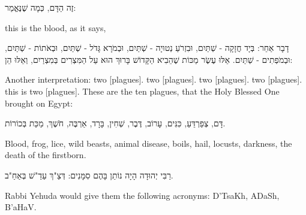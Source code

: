 
זֶה הַדָּם, כְּמָה שֶׁנֶּאֱמַר: 

\begin{english}
 this is the blood, as it says, 
\end{english}

\vspace{2em}


דָבָר אַחֵר: בְּיָד חֲזָקָה - שְׁתַּיִם, וּבִזְרֹעַ נְטוּיָה - שְׁתַּיִם, וּבְמֹרָא גָּדֹל - שְׁתַּיִם, וּבְאֹתוֹת - שְׁתַּיִם, וּבְמֹפְתִים - שְׁתַּיִם. אֵלּוּ עֶשֶׂר מַכּוֹת שֶׁהֵבִיא הַקָּדוֹשׁ בָּרוּךְ הוּא עַל הַמִּצְרִים בְּמִצְרַיִם, וְאֵלּוּ הֵן:



\begin{english}
Another interpretation:  two [plagues].  two [plagues].  two [plagues].  two [plagues].  this is two [plagues]. These are the ten plagues, that the Holy Blessed One brought on Egypt:
\end{english}

דָּם, צְפַרְדֵּעַ, כִּנִּים, עָרוֹב, דֶּבֶר, שְׁחִין, בָּרָד, אַרְבֶּה, חֹשֶׁךְ, מַכַּת בְּכוֹרוֹת.

\begin{english}
Blood, frog, lice, wild beasts, animal disease, boils, hail, locusts, darkness, the death of the firstborn.
\end{english}

רַבִּי יְהוּדָה הָיָה נוֹתֵן בָּהֶם סִמָּנִים: דְּצַ"ךְ עַדַ"שׁ בְּאַחַ"ב.

\begin{english}
Rabbi Yehuda would give them the following acronyms: D'TsaKh, ADaSh, B'aHaV.
\end{english}

\vspace{1em}

